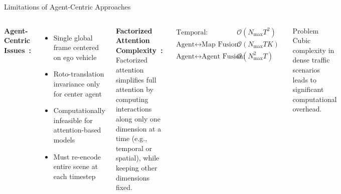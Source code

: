 \documentclass[10pt,aspectratio=169]{beamer}
\begin{document}
\begin{frame}{Limitations of Agent-Centric Approaches}
\begin{columns}[T]
\textbf{Agent-Centric Issues~\cite{qcnetZhou2023}:}
\begin{itemize}
    \item Single global frame centered on ego vehicle
    \item Roto-translation invariance only for center agent
    \item Computationally infeasible for attention-based models
    \item Must re-encode entire scene at each timestep
\end{itemize}

\textbf{Factorized Attention Complexity~\cite{qcnetZhou2023}:}
Factorized attention simplifies full attention by computing interactions along only one dimension at a time (e.g., temporal or spatial), while keeping other dimensions fixed.

\begin{align}
\text{Temporal:} &\quad \mathcal{O}(N_{\max}T^{2}) \\
\text{Agent}\leftrightarrow\text{Map Fusion:} &\quad \mathcal{O}(N_{\max}T K) \\
\text{Agent}\leftrightarrow\text{Agent Fusion:} &\quad \mathcal{O}(N_{\max}^{2}T)
\end{align}

\begin{alertblock}{Problem}
Cubic complexity in dense traffic scenarios leads to significant computational overhead.
\end{alertblock}
\end{columns}
\end{frame}
\end{document}
